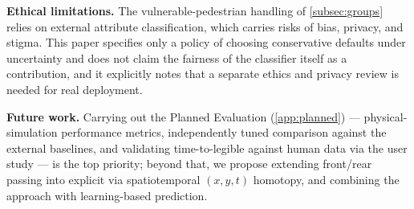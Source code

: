\noindent\textbf{Ethical limitations.} The vulnerable-pedestrian handling of \cref{subsec:groups} relies on external attribute classification, which carries risks of bias, privacy, and stigma. This paper specifies only a policy of choosing conservative defaults under uncertainty and does not claim the fairness of the classifier itself as a contribution, and it explicitly notes that a separate ethics and privacy review is needed for real deployment.

\noindent\textbf{Future work.} Carrying out the Planned Evaluation (\cref{app:planned}) --- physical-simulation performance metrics, independently tuned comparison against the external baselines, and validating time-to-legible against human data via the user study --- is the top priority; beyond that, we propose extending front/rear passing into explicit  via spatiotemporal $(x,y,t)$ homotopy, and combining the approach with learning-based prediction.

